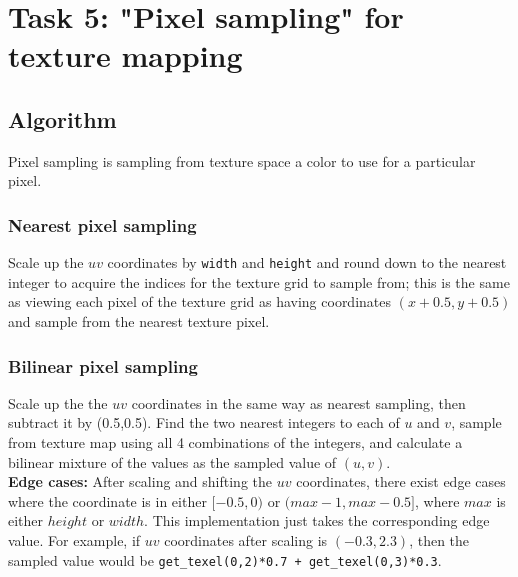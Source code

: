 \documentclass[11pt]{article}
\begin{document}
\newpage
\section{Task 5: "Pixel sampling" for texture mapping}
\subsection{Algorithm}
Pixel sampling is sampling from texture space a color to use for a particular pixel.
\subsubsection{Nearest pixel sampling}
Scale up the $uv$ coordinates by \verb|width| and \verb|height| and round down to the nearest integer to acquire the indices for the texture grid to sample from; this is the same as viewing each pixel of the texture grid as having coordinates $(x+0.5,y+0.5)$ and sample from the nearest texture pixel.
\subsubsection{Bilinear pixel sampling}
Scale up the the $uv$ coordinates in the same way as nearest sampling, then subtract it by (0.5,0.5). Find the two nearest integers to each of $u$ and $v$, sample from texture map using all 4 combinations of the integers, and calculate a bilinear mixture of the values as the sampled value of $(u,v)$.\\\textbf{Edge cases:} After scaling and shifting the $uv$ coordinates, there exist edge cases where the coordinate is in either $[-0.5,0)$ or $(max-1,max-0.5]$, where $max$ is either $height$ or $width$. This implementation just takes the corresponding edge value. For example, if $uv$ coordinates after scaling is $(-0.3,2.3)$, then the sampled value would be \verb|get_texel(0,2)*0.7 + get_texel(0,3)*0.3|.
\end{document}

